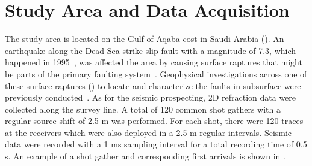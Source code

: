 \section{Study Area and Data Acquisition}
\label{sec:area_and_data}

 The study area is located on the Gulf of Aqaba cost in Saudi Arabia (). An earthquake along the Dead Sea strike-slip fault with a magnitude of 7.3, which  happened in 1995~\cite{krhm:99}, was affected the area by causing surface raptures that might be parts of the primary faulting system~\cite{ahas:96}. Geophysical investigations across one of these surface raptures () to locate and characterize the faults in subsurface were previously conducted~\cite{hjk:14}.  As for the seismic prospecting, 2D refraction data were collected along the survey line.  A total of 120 common shot gathers with a regular source shift of 2.5 m was performed. For each shot, there were 120 traces at the receivers which were also deployed in a 2.5 m regular intervals. Seismic data were recorded with a 1 ms sampling interval for a total recording time of 0.5 s. An example of a shot gather and corresponding first arrivals is shown in .
 

